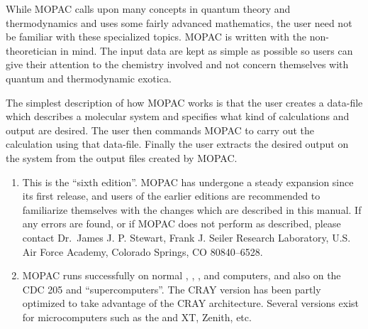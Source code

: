    While  MOPAC  calls  upon  many  concepts  in  quantum  theory   and
   thermodynamics  and  uses some fairly advanced mathematics, the user need
   not be familiar with these specialized topics.  MOPAC is written with the
   non-theoretician  in mind.  The input data are kept as simple as possible
   so users can give their attention  to  the  chemistry  involved  and  not
   concern themselves with quantum and thermodynamic exotica.

        The simplest description of how MOPAC works is that the user creates
   a data-file which describes a molecular system and specifies what kind of
   calculations and output are desired.  The user  then  commands  MOPAC  to
   carry  out  the  calculation  using  that  data-file.   Finally  the user
   extracts the desired output on the system from the output  files  created
   by MOPAC.

\begin{enumerate}
\item This is the ``sixth edition''. MOPAC has undergone a steady
 expansion  since its first release, and users of the earlier editions are
 recommended  to  familiarize  themselves  with  the  changes  which   are
 described  in this manual.  If any errors are found, or if MOPAC does not
 perform  as   described,   please   contact   Dr.\ James J. P. Stewart,
 Frank J. Seiler  Research  Laboratory,  U.S.  Air Force Academy, Colorado
 Springs, CO 80840--6528.
\item MOPAC runs successfully on normal ,  ,  
,  and    computers,  and  also  on the CDC 205 and
 ``supercomputers''.  
The CRAY version has been partly 
optimized to take  advantage  of  the  CRAY  architecture.
Several versions exist for microcomputers such as the  and 
XT, Zenith, etc.
\end{enumerate}

